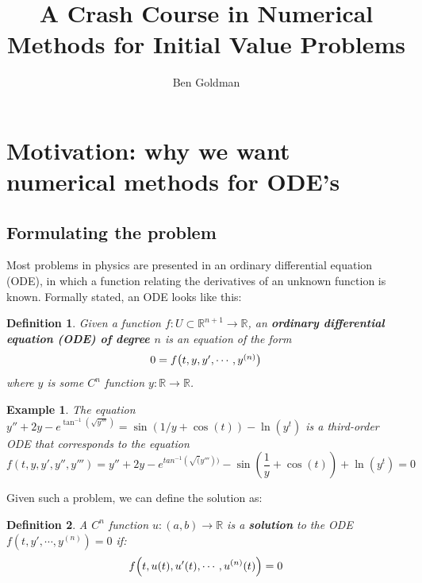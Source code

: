 \documentclass{article}
\title{A Crash Course in Numerical Methods for Initial Value Problems}
\author{Ben Goldman}
\newtheorem{definition}{Definition}[section]
\newtheorem{example}{Example}[section]
\newcommand{\R}{\mathbb{R}}
\newcommand{\0}{\vb{0}}
\begin{document}
\maketitle


\section{Motivation: why we want numerical methods for ODE's}

\subsection{Formulating the problem}

Most problems in physics are presented in an ordinary differential equation (ODE), in which a function relating the derivatives of an unknown function is known. Formally stated, an ODE looks like this:

\begin{definition}
  Given a function $f: U \subset \R^{n+1} \to \R$, an  \textbf{ordinary differential equation (ODE) of degree $n$} is an equation of the form
  \[0 = f\mqty(t, y, y', \cdots, y^{(n)})\]
  where $y$ is some $C^n$ function $y: \R\to\R$.
\end{definition}

\begin{example}
  The equation $y'' + 2y - e^{\tan^{-1}(\sqrt{y'''})} = \sin(1/y + \cos(t)) - \ln(y^t)$ is a third-order ODE that corresponds to the equation
  \[f(t, y, y', y'', y''') = y'' + 2y - e^{tan^{-1}(\sqrt(y'''))} - \sin(\frac{1}{y} + \cos(t)) + \ln(y^t) = 0\]
\end{example}

Given such a problem, we can define the solution as:
\begin{definition}
  A $C^n$ function $u: (a, b)\to\R$ is a \textbf{solution} to the ODE $f(t, y', \cdots, y^{(n)}) = 0$ if:
  \[f\qty(t, u(t), u'(t), \cdots, u^{(n)}(t)) = 0\]
\end{definition}
\end{document}
